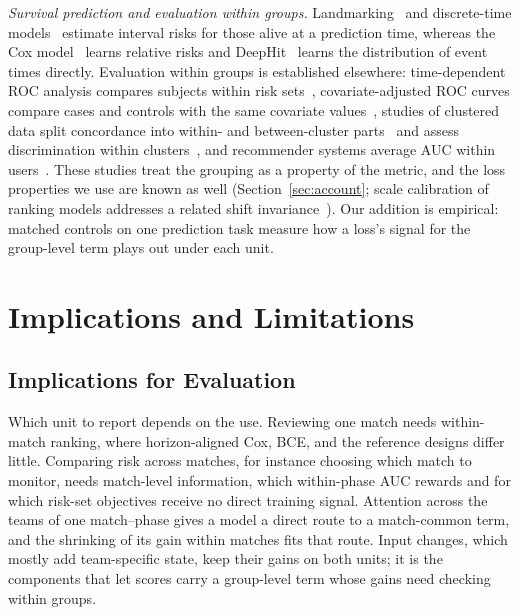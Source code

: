 \documentclass[sigconf,anonymous]{acmart}
\begin{document}
\emph{Survival prediction and evaluation within groups.} Landmarking~\cite{vanHouwelingen07} and discrete-time models~\cite{SingerWillett93,Gensheimer19} estimate interval risks for those alive at a prediction time, whereas the Cox model~\cite{Cox72} learns relative risks and DeepHit~\cite{DeepHit18,DynamicDeepHit20} learns the distribution of event times directly. Evaluation within groups is established elsewhere: time-dependent ROC analysis compares subjects within risk sets~\cite{HeagertyZheng05}, covariate-adjusted ROC curves compare cases and controls with the same covariate values~\cite{JanesPepe09}, studies of clustered data split concordance into within- and between-cluster parts~\cite{vanOirbeek10} and assess discrimination within clusters~\cite{vanKlaveren14}, and recommender systems average AUC within users~\cite{Zhou18}. These studies treat the grouping as a property of the metric, and the loss properties we use are known as well (Section~\ref{sec:account}; scale calibration of ranking models addresses a related shift invariance~\cite{Yan22}). Our addition is empirical: matched controls on one prediction task measure how a loss's signal for the group-level term plays out under each unit.

\section{Implications and Limitations}
\label{sec:discussion}
\subsection{Implications for Evaluation}
\label{sec:discussion:implications}
Which unit to report depends on the use. Reviewing one match needs within-match ranking, where horizon-aligned Cox, BCE, and the reference designs differ little. Comparing risk across matches, for instance choosing which match to monitor, needs match-level information, which within-phase AUC rewards and for which risk-set objectives receive no direct training signal. Attention across the teams of one match--phase gives a model a direct route to a match-common term, and the shrinking of its gain within matches fits that route. Input changes, which mostly add team-specific state, keep their gains on both units; it is the components that let scores carry a group-level term whose gains need checking within groups.
\end{document}
